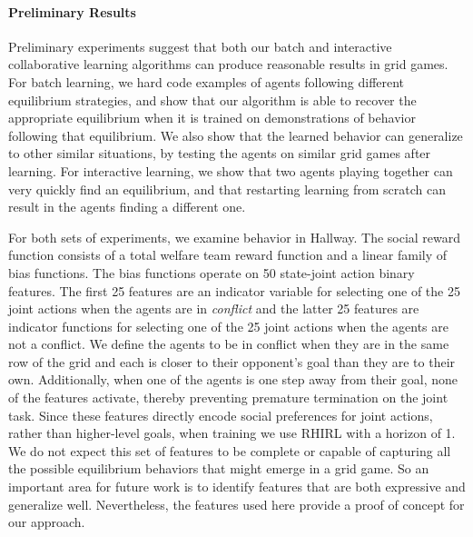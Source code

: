 
\paragraph{Preliminary Results}
\label{sec:results}




Preliminary experiments suggest that both our batch and interactive
collaborative learning algorithms can produce reasonable results in
grid games. For batch learning, we hard code examples of agents
following different equilibrium strategies, and show that our
algorithm is able to recover the appropriate equilibrium when it is
trained on demonstrations of behavior following that equilibrium. We
also show that the learned behavior can generalize to other similar
situations, by testing the agents on similar grid games after
learning. For interactive learning, we show that two agents playing
together can very quickly
find an equilibrium, and that restarting learning from scratch can
result in the agents finding a different one.

For both sets of experiments, we examine behavior in Hallway.  The
social reward function consists of a total welfare team reward
function and a linear family of bias functions. The bias functions
operate on 50 state-joint action binary features. The first 25
features are an indicator variable for selecting one of the 25 joint
actions when the agents are in {\em conflict\/} and the latter 25
features are indicator functions for selecting one of the 25 joint
actions when the agents are not a conflict. We define the agents to be
in conflict when they are in the same row of the grid and each is
closer to their opponent's goal than they are to their
own. Additionally, when one of the agents is one step away from their
goal, none of the features activate, thereby preventing premature
termination on the joint task. Since these features directly encode
social preferences for joint actions, rather than higher-level goals,
when training we use RHIRL with a horizon of 1. We do not expect this
set of features to be complete or capable of capturing all the
possible equilibrium behaviors that might emerge in a grid game. So an
important area for future work is to identify features that are both
expressive and generalize well. Nevertheless, the features used here
provide a proof of concept for our approach.

